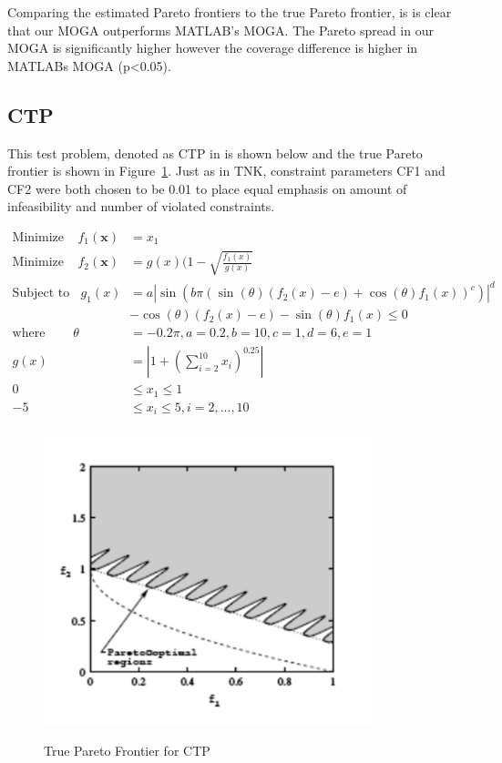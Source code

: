 \documentclass{article}
\begin{document}
\noindent Comparing the estimated Pareto frontiers to the true Pareto frontier, is is clear that our MOGA outperforms MATLAB's MOGA. The Pareto spread in our MOGA is significantly higher however the coverage difference is higher in MATLABs MOGA (p<0.05).
\newpage
\subsection{CTP} 
This test problem, denoted as CTP in \cite{deb2001multi} is shown below and the true Pareto frontier is shown in Figure~\ref{fig:CTP_true}. Just as in TNK, constraint parameters CF1 and CF2 were both chosen to be 0.01 to place equal emphasis on amount of infeasibility and number of violated constraints.


\begin{align*}
\textrm{Minimize} ~~~~~ f_1(\textbf{x}) &= x_1 \\
\textrm{Minimize} ~~~~~ f_2(\textbf{x}) &= g(x)(1-\sqrt{\frac{f_1(x)}{g(x)}} \\
\textrm{Subject to} ~~~~ g_1(x) &= a|\sin(b\pi(\sin(\theta)(f_2(x)-e)+\cos(\theta)f_1(x))^c)|^d \\
&- \cos(\theta)(f_2(x)-e)-\sin(\theta)f_1(x) \leq 0 \\
\textrm{where} ~~~~~~~~~~ \theta &= -0.2\pi, a = 0.2, b=10, c=1, d=6, e = 1 \\
g(x) &= |1+(\sum_{i=2}^{10}x_i)^{0.25}| \\
0 &\leq  x_1  \leq 1 \\
-5 &\leq  x_i  \leq 5, i = 2,...,10 \\
\end{align*}
\begin{figure}[H]
  \caption{True Pareto Frontier for CTP}
  \centering
  \includegraphics[width=0.85\textwidth]{CTP_pareto_true.png}  
  \label{fig:CTP_true}
\end{figure}
\end{document}
